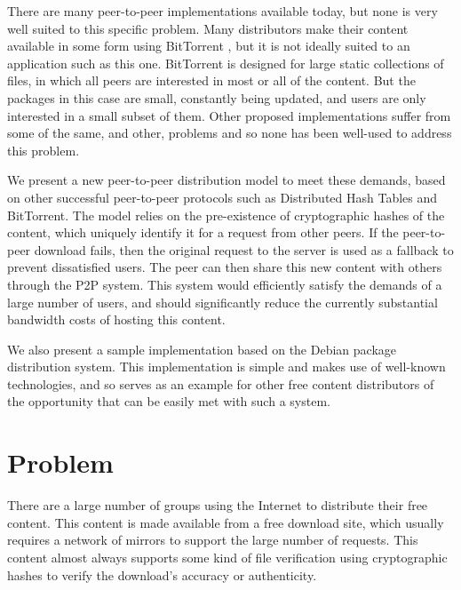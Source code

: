 \documentclass{sig-alt-release2}
\begin{document}
There are many peer-to-peer implementations available today, but
none is very well suited to this specific problem. Many distributors
make their content available in some form using BitTorrent \cite{COHEN03}, but it
is not ideally suited to an application such as this one. BitTorrent
is designed for large static collections of files, in which all
peers are interested in most or all of the content. But the packages
in this case are small, constantly being updated, and users are only
interested in a small subset of them. Other proposed implementations
suffer from some of the same, and other, problems and so none has
been well-used to address this problem.

We present a new peer-to-peer distribution model to meet these
demands, based on other successful peer-to-peer protocols such as
Distributed Hash Tables and BitTorrent.
The model relies on the pre-existence of cryptographic
hashes of the content, which uniquely identify it for a request from
other peers. If the peer-to-peer download fails, then the original
request to the server is used as a fallback to prevent dissatisfied
users. The peer can then share this new content with others through
the P2P system. This system would efficiently satisfy the demands of
a large number of users, and should significantly reduce the
currently substantial bandwidth costs of hosting this content.

We also present a sample implementation based on the Debian package
distribution system. This implementation is simple and makes use of
well-known technologies, and so serves as an example for
other free content distributors of the opportunity that can be easily met
with such a system.

\section{Problem}

There are a large number of groups using the Internet to distribute
their free content. This content is made available from a free
download site, which usually requires a network of mirrors to
support the large number of requests. This content almost always
supports some kind of file verification using cryptographic hashes
to verify the download's accuracy or authenticity.
\end{document}
